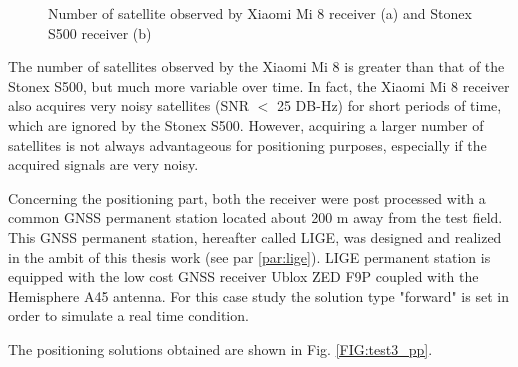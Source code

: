 \begin{figure}[H] 
	\centering
    \caption{Number of satellite observed by Xiaomi Mi 8 receiver (a) and Stonex S500 receiver (b) }
	\label{FIG:test3_nsat} 
\end{figure}

The number of satellites observed by the Xiaomi Mi 8 is greater than that of the Stonex S500, but much more variable over time. In fact, the Xiaomi Mi 8 receiver also acquires very noisy satellites (SNR $<$ 25 DB-Hz) for short periods of time, which are ignored by the Stonex S500. However, acquiring a larger number of satellites is not always advantageous for positioning purposes, especially if the acquired signals are very noisy. 


Concerning the positioning part, both the receiver were post processed with a common GNSS permanent station located about 200 m away from the test field. This GNSS permanent station, hereafter called LIGE, was designed and realized in the ambit of this thesis work (see par \ref{par:lige}). LIGE permanent station is equipped with the low cost GNSS receiver Ublox ZED F9P coupled with the Hemisphere A45 antenna. 
For this case study the solution type "forward" is set in order to simulate a real time condition. 

The positioning solutions obtained are shown in Fig. \ref{FIG:test3_pp}.

